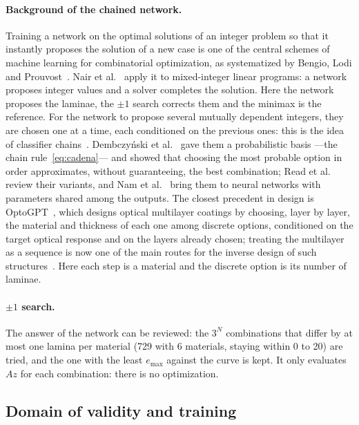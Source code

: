 \paragraph{Background of the chained network.} Training a network on the optimal solutions of an integer problem so that it instantly proposes the solution of a new case is one of the central schemes of machine learning for combinatorial optimization, as systematized by Bengio, Lodi and Prouvost~\cite{bengiolodi}. Nair et al.~\cite{nair} apply it to mixed-integer linear programs: a network proposes integer values and a solver completes the solution. Here the network proposes the laminae, the $\pm1$ search corrects them and the minimax is the reference. For the network to propose several mutually dependent integers, they are chosen one at a time, each conditioned on the previous ones: this is the idea of classifier chains~\cite{read11}. Dembczy\'nski et al.~\cite{dembczynski} gave them a probabilistic basis ---the chain rule~\eqref{eq:cadena}--- and showed that choosing the most probable option in order approximates, without guaranteeing, the best combination; Read et al.~\cite{read21} review their variants, and Nam et al.~\cite{nam} bring them to neural networks with parameters shared among the outputs. The closest precedent in design is OptoGPT~\cite{optogpt}, which designs optical multilayer coatings by choosing, layer by layer, the material and thickness of each one among discrete options, conditioned on the target optical response and on the layers already chosen; treating the multilayer as a sequence is now one of the main routes for the inverse design of such structures~\cite{ma2025}. Here each step is a material and the discrete option is its number of laminae.

\paragraph{$\pm1$ search.} The answer of the network can be reviewed: the $3^N$ combinations that differ by at most one lamina per material (729 with 6 materials, staying within 0 to 20) are tried, and the one with the least $e_{\max}$ against the curve is kept. It only evaluates $Az$ for each combination: there is no optimization.

\subsection{Domain of validity and training}\label{sec:dominio}

